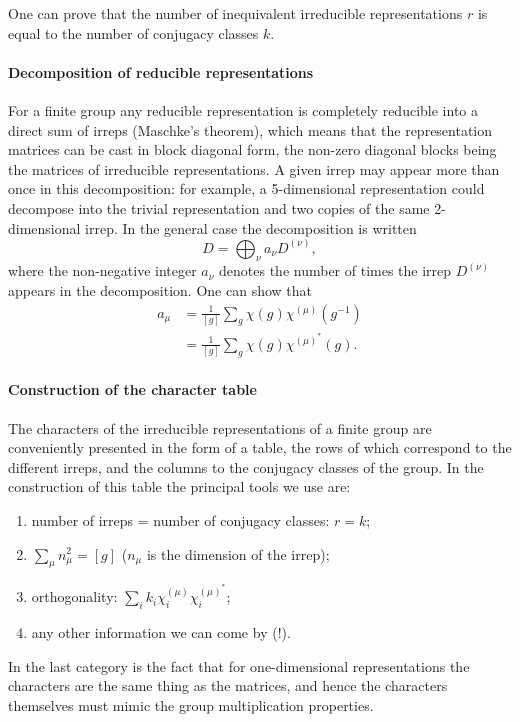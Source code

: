 \documentclass[../../main.tex]{subfiles}
\begin{document}
One can prove that the number of inequivalent irreducible representations $r$ is equal to the number of conjugacy classes $k$.


\paragraph{Decomposition of reducible representations}
For a finite group any reducible representation is completely reducible into a direct sum of irreps (Maschke's theorem), which means that the representation matrices can be cast in block diagonal form, the non-zero diagonal blocks being the matrices of irreducible representations. A given irrep may appear more than once in this decomposition: for example, a 5-dimensional representation could decompose into the trivial representation and two copies of the same 2-dimensional irrep. In the general case the decomposition is written
\begin{equation}
    D = \bigoplus_{\nu} a_\nu D^{(\nu)}  ,
\end{equation}
where the non-negative integer $a_\nu$ denotes the number of times the irrep $D^{(\nu)}$ appears in the decomposition. One can show that
\begin{align}
    a_\mu &= \frac{1}{[g]} \sum_g \chi (g) \chi^{(\mu)}(g^{-1}) \\
    &= \frac{1}{[g]} \sum_g \chi (g) \chi^{(\mu)^*}(g) .
\end{align} 

\paragraph{Construction of the character table}
The characters of the irreducible representations of a finite group are conveniently presented in the form of a table, the rows of which correspond to the different irreps, and the columns to the conjugacy classes of the group. In the construction of this table the principal tools we use are:
\begin{enumerate}
    \item number of irreps = number of conjugacy classes: $r=k$;
    \item $\sum_\mu n_\mu^2 = [g]$ ($n_\mu$ is the dimension of the irrep);
    \item orthogonality: $\sum_i k_i \chi_i^{(\mu)} \chi_i^{(\mu)^*}$;
    \item any other information we can come by (!). 
\end{enumerate}
In the last category is the fact that for one-dimensional representations the characters are the same thing as the matrices, and hence the characters themselves must mimic the group multiplication properties.
\end{document}
